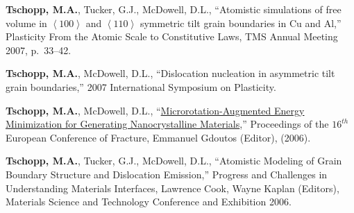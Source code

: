 \begin{cvlist}
\item 
\textbf{Tschopp, M.A.}, Tucker, G.J., McDowell, D.L., ``{Atomistic simulations of free volume in $\left\langle 100\right\rangle$ and $\left\langle 110\right\rangle$ symmetric tilt grain boundaries in Cu and Al},'' Plasticity From the Atomic Scale to Constitutive Laws,  TMS Annual Meeting 2007, p.~33--42.

\item 
\textbf{Tschopp, M.A.}, McDowell, D.L., ``Dislocation nucleation in asymmetric tilt grain boundaries,'' 2007 International Symposium on Plasticity.

\item 
\textbf{Tschopp, M.A.}, McDowell, D.L., ``\href{http://dx.doi.org/10.1007/1-4020-4972-2_325}{Microrotation-Augmented Energy Minimization for Generating Nanocrystalline Materials},'' Proceedings of the $16^{th}$ European Conference of Fracture, Emmanuel Gdoutos (Editor), (2006).

\item 
\textbf{Tschopp, M.A.}, Tucker, G.J., McDowell, D.L., ``{Atomistic Modeling of Grain Boundary Structure and Dislocation Emission},'' Progress and Challenges in Understanding Materials Interfaces, Lawrence Cook, Wayne Kaplan (Editors), Materials Science and Technology Conference and Exhibition 2006.

\end{cvlist}

